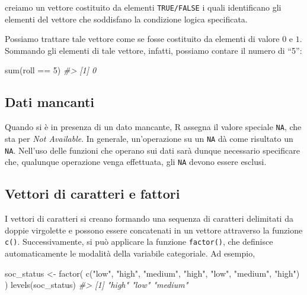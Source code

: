 \documentclass[
  11pt,
]{krantz}
\makeatletter
\newenvironment{Shaded}{\begin{snugshade}}{\end{snugshade}}
\newcommand{\CommentTok}[1]{\textcolor[rgb]{0.37,0.37,0.37}{\textit{#1}}}
\newcommand{\DecValTok}[1]{\textcolor[rgb]{0.06,0.06,0.06}{#1}}
\newcommand{\FunctionTok}[1]{\textcolor[rgb]{0,0,0}{#1}}
\newcommand{\NormalTok}[1]{#1}
\newcommand{\OtherTok}[1]{\textcolor[rgb]{0.37,0.37,0.37}{#1}}
\newcommand{\SpecialCharTok}[1]{\textcolor[rgb]{0,0,0}{#1}}
\newcommand{\StringTok}[1]{\textcolor[rgb]{0.5,0.5,0.5}{#1}}
\newenvironment{kframe}{%
\medskip{}
\setlength{\fboxsep}{.8em}
 \def\at@end@of@kframe{}%
 \ifinner\ifhmode%
  \def\at@end@of@kframe{\end{minipage}}%
  \begin{minipage}{\columnwidth}%
 \fi\fi%
 \def\FrameCommand##1{\hskip\@totalleftmargin \hskip-\fboxsep
 \colorbox{shadecolor}{##1}\hskip-\fboxsep
     \hskip-\linewidth \hskip-\@totalleftmargin \hskip\columnwidth}%
 \MakeFramed {\advance\hsize-\width
   \@totalleftmargin\z@ \linewidth\hsize
   \@setminipage}}%
 {\par\unskip\endMakeFramed%
 \at@end@of@kframe}
\renewenvironment{Shaded}{\begin{kframe}}{\end{kframe}}
\theoremstyle{definition}
\theoremstyle{definition}
\theoremstyle{definition}
\theoremstyle{definition}
\theoremstyle{remark}
\makeatother
\begin{document}
creiamo un vettore costituito da elementi \texttt{TRUE/FALSE} i quali identificano gli elementi del vettore che soddisfano la condizione logica specificata.

Possiamo trattare tale vettore come se fosse costituito da elementi di valore \(0\) e \(1\). Sommando gli elementi di tale vettore, infatti, possiamo contare il numero di ``5'':

\begin{Shaded}
\begin{Highlighting}[]
\FunctionTok{sum}\NormalTok{(roll }\SpecialCharTok{==} \DecValTok{5}\NormalTok{)}
\CommentTok{\#\textgreater{} [1] 0}
\end{Highlighting}
\end{Shaded}

\hypertarget{dati-mancanti}{%
\subsection{Dati mancanti}\label{dati-mancanti}}

Quando si è in presenza di un dato mancante, R assegna il valore speciale \texttt{NA}, che sta per \emph{Not Available}. In generale, un'operazione su un \texttt{NA} dà come risultato un \texttt{NA}. Nell'uso delle funzioni che operano sui dati sarà dunque necessario specificare che, qualunque operazione venga effettuata, gli \texttt{NA} devono essere esclusi.

\hypertarget{vettori-di-caratteri-e-fattori}{%
\subsection{Vettori di caratteri e fattori}\label{vettori-di-caratteri-e-fattori}}

I vettori di caratteri si creano formando una sequenza di caratteri delimitati da doppie virgolette e possono essere concatenati in un vettore attraverso la funzione \texttt{c()}. Successivamente, si può applicare la funzione \texttt{factor()}, che definisce automaticamente le modalità della variabile categoriale. Ad esempio,

\begin{Shaded}
\begin{Highlighting}[]
\NormalTok{soc\_status }\OtherTok{\textless{}{-}} \FunctionTok{factor}\NormalTok{(}
  \FunctionTok{c}\NormalTok{(}\StringTok{"low"}\NormalTok{, }\StringTok{"high"}\NormalTok{, }\StringTok{"medium"}\NormalTok{, }\StringTok{"high"}\NormalTok{, }\StringTok{"low"}\NormalTok{, }\StringTok{"medium"}\NormalTok{, }\StringTok{"high"}\NormalTok{)}
\NormalTok{)}
\FunctionTok{levels}\NormalTok{(soc\_status)}
\CommentTok{\#\textgreater{} [1] "high"   "low"    "medium"}
\end{Highlighting}
\end{Shaded}
\end{document}
